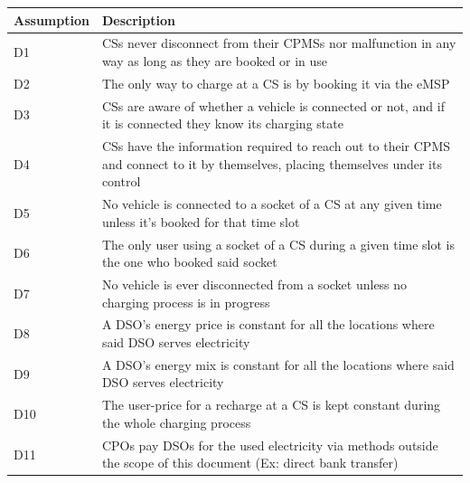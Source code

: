 \documentclass[11pt]{article}
\begin{document}
\begin{table}[H]
    \centering
    \setlength{\tabcolsep}{18pt}
    \renewcommand{\arraystretch}{1.2}
    \begin{tabularx}{\textwidth}{|>{\centering\hsize=0.3\hsize}X|>{\hsize=1.7\hsize}X|}
        \hline
        \textbf{Assumption} & \textbf{Description} \\
        \hline
        D1 & CSs never disconnect from their CPMSs nor malfunction in any way as long as they are booked or in use \\
        \hline
        D2 & The only way to charge at a CS is by booking it via the eMSP \\
        \hline
        D3 & CSs are aware of whether a vehicle is connected or not, and if it is connected they know its charging state \\
        \hline
        D4 & CSs have the information required to reach out to their CPMS and connect to it by themselves, placing themselves under its control \\
        \hline
        D5 & No vehicle is connected to a socket of a CS at any given time unless it's booked for that time slot \\
        \hline
        D6 & The only user using a socket of a CS during a given time slot is the one who booked said socket \\
        \hline
        D7 & No vehicle is ever disconnected from a socket unless no charging process is in progress \\
        \hline
        D8 & A DSO's energy price is constant for all the locations where said DSO serves electricity \\
        \hline
        D9 & A DSO's energy mix is constant for all the locations where said DSO serves electricity \\
        \hline
        D10 & The user-price for a recharge at a CS is kept constant during the whole charging process \\
        \hline
        D11 & CPOs pay DSOs for the used electricity via methods outside the scope of this document (Ex: direct bank transfer) \\
        \hline
    \end{tabularx}
    \label{tab:domain_assumptions}
\end{table}
\end{document}

